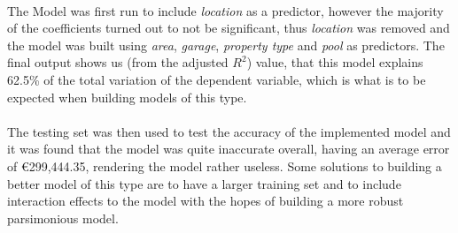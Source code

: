 \paragraph{ }The Model was first run to include \textit{location} as a predictor, however the majority of the coefficients turned out to not be significant, thus \textit{location} was removed and the model was built using \textit{area}, \textit{garage}, \textit{property type} and \textit{pool} as predictors. The final output shows us (from the adjusted $R^2$) value, that this model explains 62.5\% of the total variation of the dependent variable, which is what is to be expected when building models of this type.

\paragraph{ }The testing set was then used to test the accuracy of the implemented model and it was found that the model was quite inaccurate overall, having an average error of \euro299,444.35, rendering the model rather useless. Some solutions to building a better model of this type are to have a larger training set and to include interaction effects to the model with the hopes of building a more robust parsimonious model.